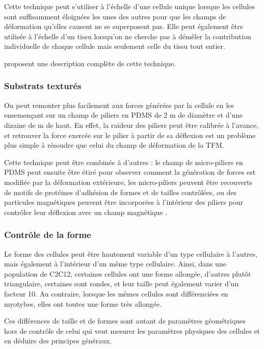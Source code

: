 Cette technique peut s'utiliser à l'échelle d'une cellule unique lorsque les cellules sont suffisamment éloignées les unes des autres pour que les champs de déformation qu'elles causent ne se superposent pas. 
Elle peut également être utilisée à l'échelle d'un tissu lorsqu'on ne cherche pas à démêler la contribution individuelle de chaque cellule mais seulement celle du tissu tout entier. 

\cite{martiel_measurement_2015} proposent une description complète de cette technique. 

\subsubsection{Substrats texturés}

On peut remonter plus facilement aux forces générées par la cellule en les ensemençant sur un champ de piliers en PDMS de 2 \micro m de diamètre et d'une dizaine de \micro m de haut. 
En effet, la raideur des piliers peut être calibrée à l'avance, et retrouver la force exercée sur le pilier à partir de sa déflexion est un problème plus simple à résoudre que celui du champ de déformation de la TFM. 

Cette technique peut être combinée à d'autres : le champ de micro-piliers en PDMS peut ensuite être étiré pour observer comment la génération de forces est modifiée par la déformation extérieure, les micro-piliers peuvent être recouverts de motifs de protéines d'adhésion de formes et de tailles contrôlées, ou des particules magnétiques peuvent être incorporées à l'intérieur des piliers pour contrôler leur déflexion avec un champ magnétique \parencite{gupta_micropillar_2015}. 

\subsubsection{Contrôle de la forme}

Le forme des cellules peut être hautement variable d'un type cellulaire à l'autres, mais également à l'intérieur d'un même type cellulaire. 
Ainsi, dans une population de C2C12, certaines cellules ont une forme allongée, d'autres plutôt triangulaire, certaines sont rondes, et leur taille peut également varier d'un facteur 10. Au contraire, lorsque les mêmes cellules sont différenciées en myotybes, elles ont toutes une forme très allongée. 

Ces différences de taille et de formes sont autant de paramètres géométriques hors de contrôle de celui qui veut mesurer les paramètres physiques des cellules et en déduire des principes généraux. 

